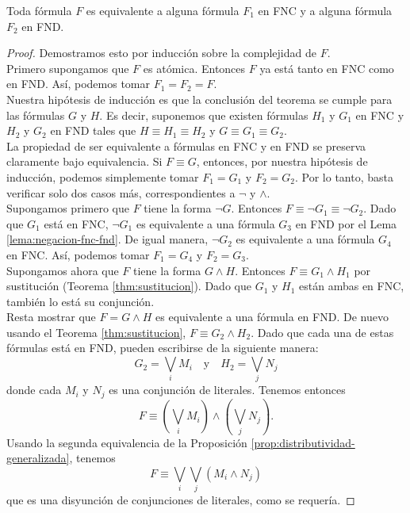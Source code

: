 \message{ !name(main.tex)}\documentclass[12pt,a4paper]{book}
\begin{document}
    \begin{teorema}\label{thm:existencia-fnc-fnd}
        Toda fórmula $F$ es equivalente a alguna fórmula $F_{1}$ en FNC y a alguna fórmula $F_{2}$ en FND.
    \end{teorema}
    \begin{proof}
        Demostramos esto por inducción sobre la complejidad de $F$.\\
        Primero supongamos que $F$ es atómica. Entonces $F$ ya está tanto en FNC como en FND. Así, podemos tomar $F_{1}=F_{2}=F$.\\
        Nuestra hipótesis de inducción es que la conclusión del teorema se cumple para las fórmulas $G$ y $H$. Es decir,
        suponemos que existen fórmulas $H_{1}$ y $G_{1}$ en FNC y $H_{2}$ y $G_{2}$ en FND tales que $H\equiv H_{1}\equiv H_{2}$
        y $G\equiv G_{1}\equiv G_{2}$.\\
        La propiedad de ser equivalente a fórmulas en FNC y en FND se preserva claramente bajo equivalencia. Si $F\equiv G$,
        entonces, por nuestra hipótesis de inducción, podemos simplemente tomar $F_{1}=G_{1}$ y $F_{2}=G_{2}$. Por lo tanto,
        basta verificar solo dos casos más, correspondientes a $\neg$ y $\wedge$.\\
        Supongamos primero que $F$ tiene la forma $\neg G$. Entonces $F\equiv\neg G_{1}\equiv\neg G_{2}$. Dado que $G_{1}$ está
        en FNC, $\neg G_{1}$ es equivalente a una fórmula $G_{3}$ en FND por el Lema \ref{lema:negacion-fnc-fnd}. De igual
        manera, $\neg G_{2}$ es equivalente a una fórmula $G_{4}$ en FNC. Así, podemos tomar $F_{1}=G_{4}$ y $F_{2}=G_{3}$.\\
        Supongamos ahora que $F$ tiene la forma $G\wedge H$. Entonces $F\equiv G_{1}\wedge H_{1}$ por sustitución (Teorema
        \ref{thm:sustitucion}). Dado que $G_{1}$ y $H_{1}$ están ambas en FNC, también lo está su conjunción.\\
        Resta mostrar que $F=G\wedge H$ es equivalente a una fórmula en FND. De nuevo usando el Teorema
        \ref{thm:sustitucion}, $F\equiv G_{2}\wedge H_{2}$. Dado que cada una de estas fórmulas está en FND, pueden escribirse
        de la siguiente manera:
        \begin{equation*}
            G_{2}=\bigvee_{i}M_{i}\quad\text{y}\quad H_{2}=\bigvee_{j}N_{j}
        \end{equation*}
        donde cada $M_{i}$ y $N_{j}$ es una conjunción de literales. Tenemos entonces
        \begin{equation*}
            F\equiv\left(\bigvee_{i}M_{i}\right)\wedge\left(\bigvee_{j}N_{j}\right).
        \end{equation*}
        Usando la segunda equivalencia de la Proposición \ref{prop:distributividad-generalizada}, tenemos
        \begin{equation*}
            F\equiv\bigvee_{i}\bigvee_{j}(M_{i}\wedge N_{j})
        \end{equation*}
        que es una disyunción de conjunciones de literales, como se requería.
    \end{proof}
\end{document}
